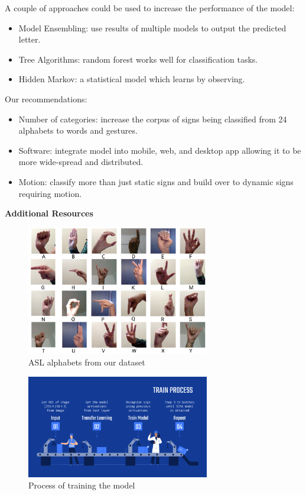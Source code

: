 \documentclass[twocolumn]{article}
\begin{document}
A couple of approaches could be used to increase the performance of the model:

\begin{itemize}
	\item Model Ensembling: use results of multiple models to output the 
	predicted letter.
	\item Tree Algorithms: random forest works well for classification tasks.
	\item Hidden Markov: a statistical model which learns by observing.
\end{itemize}

Our recommendations:

\begin{itemize}
	\item Number of categories: increase the corpus of signs being classified 
	from 24 alphabets to words and gestures.
	\item Software: integrate model into mobile, web, and desktop app allowing 
	it to be more wide-spread and distributed.
	\item Motion: classify more than just static signs and build over to dynamic 
	signs requiring motion.
\end{itemize}





\listoffigures
\listoftables

\glsaddall
\setlength{\glsdescwidth}{0.8\textwidth}
\printglossary[type=\acronymtype,title=List Of Abbreviations]

\clearpage
\LARGE{\textbf{Additional Resources}}

\begin{figure}[h]
\centering
\includegraphics[width=8cm]{./figures/alphabets}
\caption{ASL alphabets from our dataset}
\end{figure}

\begin{figure}[h]
\centering
\includegraphics[width=8cm]{./figures/train process}
\caption{Process of training the model}
\end{figure}
\end{document}
